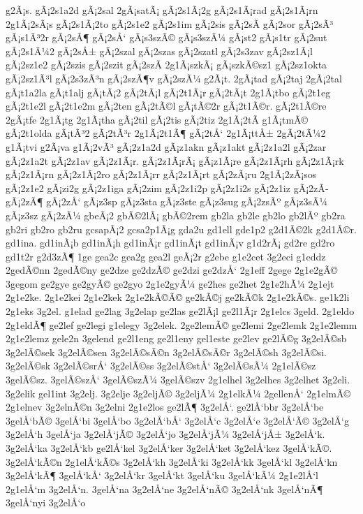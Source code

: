 {g2Ã¡s.
gÃ¡2s1a2d
gÃ¡2sal
2gÃ¡satÃ¡
gÃ¡2s1Ã¡2g
gÃ¡2s1Ã¡rad
gÃ¡2s1Ã¡rn
2g1Ã¡2sÃ¡s
gÃ¡2s1Ã¡2to
gÃ¡2s1e2
gÃ¡2s1im
gÃ¡2sis
gÃ¡2sÃ­
gÃ¡2sor
gÃ¡2sÃ³
gÃ¡s1Ã³2r
gÃ¡2sÃ¶
gÃ¡2sÅ‘
gÃ¡s3szÃ©
gÃ¡s3szÃ¼
gÃ¡st2
gÃ¡s1tr
gÃ¡2sut
gÃ¡2s1Ã¼2
gÃ¡2sÅ±
gÃ¡2szal
gÃ¡2szas
gÃ¡2szatl
gÃ¡2s3zav
gÃ¡2sz1Ã¡l
gÃ¡2sz1e2
gÃ¡2szis
gÃ¡2szit
gÃ¡2szÃ­
2g1Ã¡szkÃ¡
gÃ¡szkÃ©sz1
gÃ¡2sz1okta
gÃ¡2sz1Ã³l
gÃ¡2s3zÃ³n
gÃ¡2szÃ¶v
gÃ¡2szÃ¼
g2Ã¡t.
2gÃ¡tad
gÃ¡2taj
2gÃ¡2tal
gÃ¡t1a2la
gÃ¡t1alj
gÃ¡tÃ¡2
gÃ¡2tÃ¡l
gÃ¡2t1Ã¡r
gÃ¡2tÃ¡t
2g1Ã¡tbo
gÃ¡2t1eg
gÃ¡2t1e2l
gÃ¡2t1e2m
gÃ¡2ten
gÃ¡2tÃ©l
gÃ¡tÃ©2r
gÃ¡2t1Ã©r.
gÃ¡2t1Ã©re
2gÃ¡tfe
2g1Ã¡tg
2g1Ã¡tha
gÃ¡2til
gÃ¡2tis
gÃ¡2tiz
2g1Ã¡2tÃ­
g1Ã¡tmÃ©
gÃ¡2t1olda
gÃ¡tÃ³2
gÃ¡2tÃ³r
2g1Ã¡2t1Ã¶
gÃ¡2tÅ‘
2g1Ã¡ttÅ±
2gÃ¡2tÃ¼2
g1Ã¡tvi
g2Ã¡va
g1Ã¡2vÃ³
gÃ¡2z1a2d
gÃ¡z1akn
gÃ¡z1akt
gÃ¡2z1a2l
gÃ¡2zar
gÃ¡2z1a2t
gÃ¡2z1av
gÃ¡2z1Ã¡r.
gÃ¡2z1Ã¡rÃ¡
gÃ¡z1Ã¡re
gÃ¡2z1Ã¡rh
gÃ¡2z1Ã¡rk
gÃ¡2z1Ã¡rn
gÃ¡2z1Ã¡2ro
gÃ¡2z1Ã¡rr
gÃ¡2z1Ã¡rt
gÃ¡2zÃ¡ru
2g1Ã¡2zÃ¡sos
gÃ¡2z1e2
gÃ¡zi2g
gÃ¡2z1iga
gÃ¡2zim
gÃ¡2z1i2p
gÃ¡2z1i2s
gÃ¡2z1iz
gÃ¡2zÃ­
gÃ¡2zÃ¶
gÃ¡2zÅ‘
gÃ¡z3sp
gÃ¡z3sta
gÃ¡z3ste
gÃ¡z3sug
gÃ¡2zsÃº
gÃ¡z3sÃ¼
gÃ¡z3sz
gÃ¡2zÃ¼
gbeÃ¡2
gbÃ©2lÃ¡
gbÃ©2rem
gb2la
gb2le
gb2lo
gb2lÃº
gb2ra
gb2ri
gb2ro
gb2ru
gcsapÃ¡2
gcsa2p1Ã¡g
gda2u
gd1ell
gde1p2
g2d1Ã©2k
g2d1Ã©r.
gd1ina.
gd1inÃ¡b
gd1inÃ¡h
gd1inÃ¡r
gd1inÃ¡t
gd1inÃ¡v
g1d2rÃ¡
gd2re
gd2ro
gd1t2r
g2d3zÃ¶
1ge
gea2c
gea2g
gea2l
geÃ¡2r
g2ebe
g1e2cet
3g2eci
g1eddz
2gedÃ©nn
2gedÃ©ny
ge2dze
ge2dzÃ©
ge2dzi
ge2dzÅ‘
2g1eff
2gege
2g1e2gÃ©
3gegom
ge2gye
ge2gyÃ©
ge2gyo
2g1e2gyÃ¼
ge2hes
ge2het
2g1e2hÃ¼
2g1ejt
2g1e2ke.
2g1e2kei
2g1e2kek
2g1e2kÃ©Ã©
ge2kÃ©j
ge2kÃ©k
2g1e2kÃ©s.
ge1k2li
2g1eks
3g2el.
g1elad
ge2lag
3g2elap
ge2las
ge2lÃ¡l
ge2l1Ã¡r
2g1elcs
3geld.
2g1eldo
2g1eldÃ¶
ge2lef
ge2legi
g1elegy
3g2elek.
2ge2lemÃ©
ge2lemi
2ge2lemk
2g1e2lemm
2g1e2lemz
gele2n
3gelend
ge2l1eng
ge2l1eny
gel1este
ge2lev
ge2lÃ©g
3g2elÃ©sb
3g2elÃ©sek
3g2elÃ©sen
3g2elÃ©sÃ©n
3g2elÃ©sÃ©r
3g2elÃ©sh
3g2elÃ©si.
3g2elÃ©sk
3g2elÃ©srÅ‘
3g2elÃ©ss
3g2elÃ©stÅ‘
3g2elÃ©sÃ¼
2g1elÃ©sz
3gelÃ©sz.
3gelÃ©szÅ‘
3gelÃ©szÃ¼
3gelÃ©szv
2g1elhel
3g2elhes
3g2elhet
3g2eli.
3g2elik
gel1int
3g2elj.
3g2elje
3g2eljÃ©
3g2eljÃ¼
2g1elkÃ¼
2gellenÅ‘
2g1elmÃ©
2g1elnev
3g2elnÃ©n
3g2elni
2g1e2los
ge2lÃ¶
3g2elÅ‘.
ge2lÅ‘bbr
3g2elÅ‘be
3gelÅ‘bÃ©
3gelÅ‘bi
3gelÅ‘bo
3g2elÅ‘bÅ‘
3g2elÅ‘c
3g2elÅ‘e
3g2elÅ‘Ã©
3g2elÅ‘g
3g2elÅ‘h
3gelÅ‘ja
3g2elÅ‘jÃ©
3g2elÅ‘jo
3g2elÅ‘jÃ¼
3g2elÅ‘jÅ±
3g2elÅ‘k.
3g2elÅ‘ka
3g2elÅ‘kb
ge2lÅ‘kel
3g2elÅ‘ker
3g2elÅ‘ket
3g2elÅ‘kez
3gelÅ‘kÃ©.
3g2elÅ‘kÃ©n
2g1elÅ‘kÃ©s
3g2elÅ‘kh
3g2elÅ‘ki
3g2elÅ‘kk
3gelÅ‘kl
3g2elÅ‘kn
3g2elÅ‘kÃ¶
3gelÅ‘kÅ‘
3g2elÅ‘kr
3gelÅ‘kt
3gelÅ‘ku
3gelÅ‘kÃ¼
2g1e2lÅ‘l
2g1elÅ‘m
3g2elÅ‘n.
3gelÅ‘na
3g2elÅ‘ne
3g2elÅ‘nÃ©
3g2elÅ‘nk
3gelÅ‘nÃ¶
3gelÅ‘nyi
3g2elÅ‘o
}
